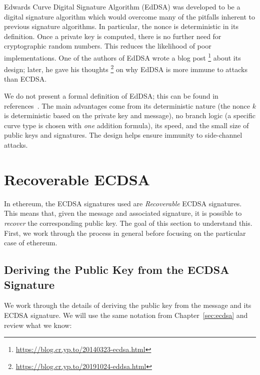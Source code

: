 Edwards Curve Digital Signature Algorithm (EdDSA)
was developed to be a digital signature algorithm which would
overcome many of the pitfalls inherent to previous signature algorithms.
In particular, the \gls{nonce} is deterministic in its definition.
Once a private key is computed, there is no further need
for cryptographic random numbers.
This reduces the likelihood of poor implementations.
One of the authors of EdDSA wrote a blog post%
\footnote{\url{https://blog.cr.yp.to/20140323-ecdsa.html}}
about its design;
later, he gave his thoughts%
\footnote{\url{https://blog.cr.yp.to/20191024-eddsa.html}}
on why EdDSA is more immune to attacks than ECDSA.

We do not present a formal definition of EdDSA;
this can be found in references~\cite{ed25519,moreEdDSA,rfc8032}.
The main advantages come from its deterministic nature
(the \gls{nonce} $k$ is deterministic based on the private key and message),
no branch logic (a specific curve type is chosen with \emph{one}
addition formula),
its speed, and the small size of public keys and signatures.
The design helps ensure immunity to side-channel attacks.



\section{Recoverable ECDSA}
\label{sec:recoverable_ecdsa}

In \gls{ethereum}, the ECDSA signatures used are \emph{Recoverable}
ECDSA signatures.
This means that, given the message and associated signature,
it is possible to \emph{recover} the corresponding public key.
The goal of this section to understand this.
First, we work through the process in general before focusing
on the particular case of \gls{ethereum}.

\subsection{Deriving the Public Key from the ECDSA Signature}

We work through the details of deriving the public key from
the message and its ECDSA signature.
We will use the same notation from Chapter~\ref{sec:ecdsa}
and review what we know:

